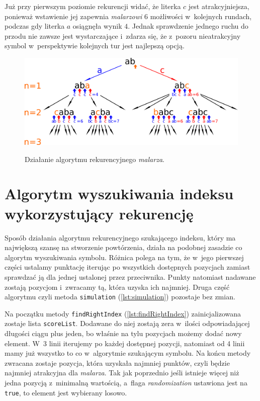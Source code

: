 \documentclass[document]{xmgr}
\begin{document}
Już przy pierwszym poziomie rekurencji widać, że literka $c$ jest atrakcyjniejsza, ponieważ wstawienie jej zapewnia \emph{malarzowi} $6$ możliwości w~kolejnych rundach, podczas gdy literka $a$ osiągnęła wynik $4$. Jednak sprawdzenie jednego ruchu do przodu nie zawsze jest wystarczające i~zdarza się, że z~pozoru nieatrakcyjny symbol w~perspektywie kolejnych tur jest najlepszą opcją.
\begin{figure}[tbh]
    \centering
    \caption{Działanie algorytmu rekurencyjnego \emph{malarza}.}
    \includegraphics[width = \textwidth]{images/nestingPainter}
    \label{fig:nestingPainter}
\end{figure}



\section{Algorytm wyszukiwania indeksu wykorzystujący rekurencję}
Sposób działania algorytmu rekurencyjnego szukającego indeksu, który ma największą szansę na stworzenie powtórzenia, działa na podobnej zasadzie co algorytm wyszukiwania symbolu. Różnica polega na tym, że w~jego pierwszej części ustalamy punktację iterując po wszystkich dostępnych pozycjach zamiast sprawdzać ją dla jednej ustalonej przez przeciwnika. Punkty natomiast nadawane zostają pozycjom i~zwracamy tą, która uzyska ich najmniej. Druga część algorytmu czyli metoda \texttt{simulation} (\ref{lst:simulation}) pozostaje bez zmian.

Na początku metody \texttt{findRightIndex} (\ref{lst:findRightIndex}) zainicjalizowana zostaje lista \texttt{scoreList}. Dodawane do niej zostają zera w~ilości odpowiadającej długości ciągu plus jeden, bo właśnie na tylu pozycjach możemy dodać nowy element. W~3 linii iterujemy po każdej dostępnej pozycji, natomiast od 4 linii mamy już wszystko to co w~algorytmie szukającym symbolu. Na końcu metody zwracana zostaje pozycja, która uzyskała najmniej punktów, czyli będzie najmniej atrakcyjna dla \emph{malarza}. Tak jak poprzednio jeśli istnieje więcej niż jedna pozycją z~minimalną wartością, a~flaga \emph{randomization} ustawiona jest na \texttt{true}, to element jest wybierany losowo.
\end{document}
